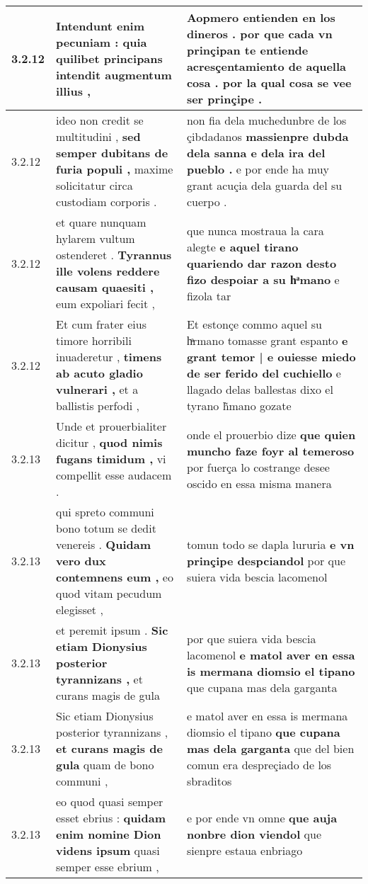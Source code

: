 \begin{tabular}{|p{1cm}|p{6.5cm}|p{6.5cm}|}
3.2.12 & Intendunt enim pecuniam : \textbf{ quia quilibet principans } intendit augmentum illius , & Aopmero entienden en los dineros . \textbf{ por que cada vn prinçipan te entiende acresçentamiento de aquella cosa . } por la qual cosa se vee ser prinçipe . \\\hline
3.2.12 & ideo non credit se multitudini , \textbf{ sed semper dubitans de furia populi , } maxime solicitatur circa custodiam corporis . & non fia dela muchedunbre de los çibdadanos \textbf{ massienpre dubda dela sanna e dela ira del pueblo . } e por ende ha muy grant acuçia dela guarda del su cuerpo . \\\hline
3.2.12 & et quare nunquam hylarem vultum ostenderet . \textbf{ Tyrannus ille volens reddere causam quaesiti , } eum expoliari fecit , & que nunca mostraua la cara alegte \textbf{ e aquel tirano quariendo dar razon desto fizo despoiar a su hͣmano } e fizola tar \\\hline
3.2.12 & Et cum frater eius timore horribili inuaderetur , \textbf{ timens ab acuto gladio vulnerari , } et a ballistis perfodi , & Et estonçe commo aquel su hͣrmano tomasse grant espanto \textbf{ e grant temor | e ouiesse miedo de ser ferido del cuchiello } e llagado delas ballestas dixo el tyrano h̃mano gozate \\\hline
3.2.13 & Unde et prouerbialiter dicitur , \textbf{ quod nimis fugans timidum , } vi compellit esse audacem . & onde el prouerbio dize \textbf{ que quien muncho faze foyr al temeroso } por fuerça lo costrange desee oscido en essa misma manera \\\hline
3.2.13 & qui spreto communi bono totum se dedit venereis . \textbf{ Quidam vero dux contemnens eum , } eo quod vitam pecudum elegisset , & tomun todo se dapla lururia \textbf{ e vn prinçipe despciandol } por que suiera vida bescia lacomenol \\\hline
3.2.13 & et peremit ipsum . \textbf{ Sic etiam Dionysius posterior tyrannizans , } et curans magis de gula & por que suiera vida bescia lacomenol \textbf{ e matol aver en essa is mermana diomsio el tipano } que cupana mas dela garganta \\\hline
3.2.13 & Sic etiam Dionysius posterior tyrannizans , \textbf{ et curans magis de gula } quam de bono communi , & e matol aver en essa is mermana diomsio el tipano \textbf{ que cupana mas dela garganta } que del bien comun era despreçiado de los sbraditos \\\hline
3.2.13 & eo quod quasi semper esset ebrius : \textbf{ quidam enim nomine Dion videns ipsum } quasi semper esse ebrium , & e por ende vn omne \textbf{ que auja nonbre dion viendol } que sienpre estaua enbriago \\\hline

\end{tabular}
